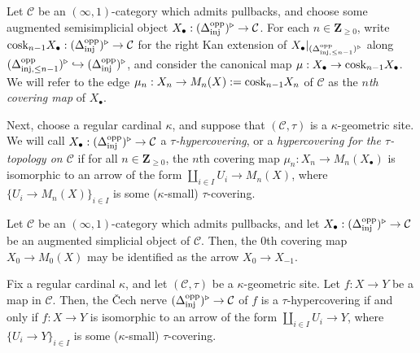 \documentclass[10pt]{article}
\newcommand{\C}{\mathcal C}
\newcommand{\ZZ}{\mathbb{Z}}
\def\ZZ{{\mathbf Z}}
\theoremstyle{witharg}
\theoremstyle{witharg}
\theoremstyle{witharg2}
\begin{document}
\begin{definition}{}\label{Hypercoverings Definition}

    Let $\C$ be an $(\infty,1)$-category which admits pullbacks, and choose some augmented semisimplicial object $X_\bullet:(\Delta^{\textnormal{opp}}_{\textnormal{inj}})^\triangleright\rightarrow \C$. For each $n\in \ZZ_{\geq 0}$, write $\textnormal{cosk}_{n-1}X_\bullet:(\Delta^{\textnormal{opp}}_{\textnormal{inj}})^\triangleright\rightarrow \C$ for the right Kan extension of $X_\bullet|_{(\Delta^{\textnormal{opp}}_{\textnormal{inj},\leq n-1})^\triangleright}$ along $(\Delta^{\textnormal{opp}}_{\textnormal{inj},\leq n-1})^\triangleright\hookrightarrow (\Delta^{\textnormal{opp}}_{\textnormal{inj}})^\triangleright$, and consider the canonical map $\mu:X_\bullet\rightarrow \textnormal{cosk}_{n-1}X_\bullet$. We will refer to the edge $\mu_{n}:X_{n}\rightarrow M_n(X):=\textnormal{cosk}_{n-1}X_{n}$ of $\C$ as the \emph{$n$th covering map} of $X_\bullet$. 

    Next, choose a regular cardinal $\kappa$, and suppose that $(\C,\tau)$ is a $\kappa$-geometric site. We will call $X_\bullet:(\Delta^{\textnormal{opp}}_{\textnormal{inj}})^\triangleright\rightarrow \C$ a \emph{$\tau$-hypercovering}, or a \emph{hypercovering for the $\tau$-topology on $\C$} if for all $n\in \ZZ_{\geq 0}$, the $n$th covering map $\mu_{n}:X_{n}\rightarrow M_n(X_\bullet)$ is isomorphic to an arrow of the form $\coprod_{i\in I}U_i\rightarrow M_n(X)$, where $\{U_i\rightarrow M_n(X)\}_{i\in I}$ is some ($\kappa$-small) $\tau$-covering.

\end{definition}

\begin{example}{}

    Let $\C$ be an $(\infty,1)$-category which admits pullbacks, and let $X_\bullet:(\Delta^{\textnormal{opp}}_{\textnormal{inj}})^\triangleright\rightarrow \C$ be an augmented simplicial object of $\C$. Then, the $0$th covering map $X_0\rightarrow M_0(X)$ may be identified as the arrow $X_0\rightarrow X_{-1}$.
    
\end{example}

\begin{example}{}\label{Cech nerves Hypercovering Example}

    Fix a regular cardinal $\kappa$, and let $(\C,\tau)$ be a $\kappa$-geometric site. Let $f:X\rightarrow Y$ be a map in $\C$. Then, the \v{C}ech nerve $(\Delta^{\textnormal{opp}}_{\textnormal{inj}})^\triangleright\rightarrow \C$ of $f$ is a $\tau$-hypercovering if and only if $f:X\rightarrow Y$ is isomorphic to an arrow of the form $\coprod_{i\in I}U_i\rightarrow Y$, where $\{U_i\rightarrow Y\}_{i\in I}$ is some ($\kappa$-small) $\tau$-covering.

\end{example}
\end{document}

